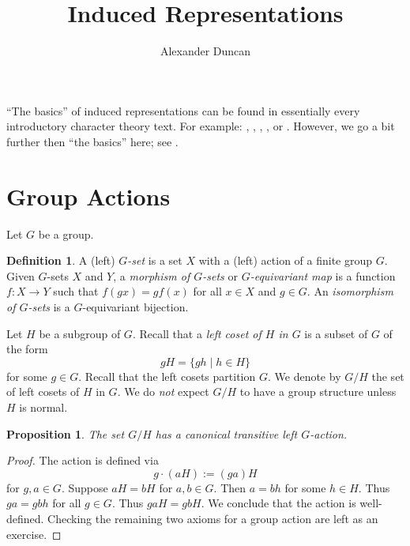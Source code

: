 \documentclass[12pt]{article}
\theoremstyle{plain}
\newtheorem{proposition}[theorem]{Proposition}
\theoremstyle{definition}
\newtheorem{definition}[theorem]{Definition}
\theoremstyle{remark}
\numberwithin{equation}{section}
\begin{document}
\title{Induced Representations}
\author{Alexander Duncan}

\maketitle

``The basics'' of induced representations can be found in essentially
every introductory character theory text.  For example:
\cite[\S{16}]{AlperinBell},
\cite[\S{5.8-5.11}]{Etingof},
\cite[\S{3.3}]{FultonHarris},
\cite[\S{XVIII.6--9}]{Lang}, or
\cite[\S{3.3}]{Serre}.
However, we go a bit further then ``the basics'' here;
see \cite[\S{7--10}]{Serre}.


\section{Group Actions}

Let $G$ be a group.

\begin{definition}
A (left) \emph{$G$-set} is a set $X$ with a (left) action of a finite
group $G$.  Given $G$-sets $X$ and $Y$, a \emph{morphism of $G$-sets}
or \emph{$G$-equivariant map} is a function $f : X \to Y$
such that $f(gx)=gf(x)$ for all $x \in X$ and $g \in G$.
An \emph{isomorphism of $G$-sets} is a $G$-equivariant bijection. 
\end{definition}

Let $H$ be a subgroup of $G$.  Recall that a \emph{left coset of $H$ in
$G$} is a subset of $G$ of the form
\[
gH = \{ gh \mid h \in H \}
\]
for some $g \in G$.  Recall that the left cosets partition $G$.
We denote by $G/H$ the set of left cosets of $H$ in $G$.
We do \emph{not} expect $G/H$ to have a group structure unless $H$ is
normal.

\begin{proposition}
The set $G/H$ has a canonical transitive left $G$-action.
\end{proposition}

\begin{proof}
The action is defined via
\[
g \cdot (aH) := (ga)H
\]
for $g,a \in G$.
Suppose $aH=bH$ for $a,b \in G$.  Then $a=bh$ for some $h \in H$.
Thus $ga=gbh$ for all $g \in G$.  Thus $gaH=gbH$.
We conclude that the action is well-defined.
Checking the remaining two axioms for a group action are left as an exercise.
\end{proof}
\end{document}

